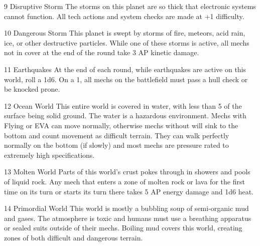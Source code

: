 9       Disruptive Storm                   The storms on this planet are so thick that electronic
                                            systems cannot function. All tech actions and system
                                            checks are made at +1 difficulty.

10      Dangerous Storm                    This planet is swept by storms of fire, meteors, acid
                                            rain, ice, or other destructive particles. While one of
                                           these storms is active, all mechs not in cover at the end
                                            of the round take 3 AP kinetic damage.

11      Earthquakes                        At the end of each round, while earthquakes are active
                                            on this world, roll a 1d6. On a 1, all mechs on the
                                            battlefield must pass a hull check or be knocked prone.

12      Ocean World                        This entire world is covered in water, with less than 5%
                                            of the surface being solid ground. The water is a
                                            hazardous environment. Mechs with Flying or EVA can
                                            move normally, otherwise mechs without will sink to the
                                            bottom and count movement as difficult terrain. They
                                            can walk perfectly normally on the bottom (if slowly)
                                            and most mechs are pressure rated to extremely high
                                            specifications.

13      Molten World                        Parts of this world’s crust pokes through in showers
                                            and pools of liquid rock. Any mech that enters a zone of
                                            molten rock or lava for the first time on its turn or starts
                                            its turn there takes 5 AP energy damage and 1d6 heat.

14      Primordial World                   This world is mostly a bubbling soup of semi-organic
                                            mud and gases. The atmosphere is toxic and humans
                                            must use a breathing apparatus or sealed suits outside
                                            of their mechs. Boiling mud covers this world, creating
                                            zones of both difficult and dangerous terrain.

